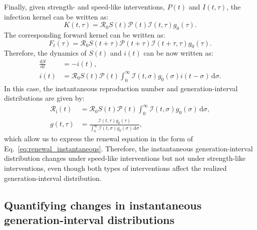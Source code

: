 \documentclass[12pt]{article}
\newcommand{\eref}[1]{Eq.~\ref{eq:#1}}
\newcommand{\Rx}[1]{\ensuremath{{\mathcal R}_{#1}}\xspace}
\newcommand{\Ro}{\Rx{0}}
\newcommand{\Ri}{\Rx{\mathrm{i}}}
\newcommand{\RR}{\ensuremath{{\mathcal R}}\xspace}
\newcommand{\dd}[1]{\ensuremath{\, \mathrm{d}#1}}
\newcommand{\dsigma}{\dd{\sigma}}
\newcommand{\PP}{{\mathcal P}}
\newcommand{\II}{{\mathcal I}}
\begin{document}
Finally, given strength- and speed-like interventions, $P(t)$ and $I(t, \tau)$, the infection kernel can be written as:
\begin{equation}
K(t, \tau) = \Ro S(t) \PP(t) \II(t,\tau) g_0(\tau).
\end{equation}
The corresponding forward kernel can be written as:
\begin{equation}
F_t(\tau) = \Ro S(t+\tau) \PP(t + \tau) \II(t+\tau, \tau) g_0(\tau).
\end{equation}
Therefore, the dynamics of $S(t)$ and $i(t)$ can be now written as:
\begin{align}
\frac{\mathrm{d}S}{\mathrm{d}t} &= - i(t),\\
i(t) &= \Ro S(t) \PP(t) \int_0^\infty \II(t, \sigma) g_0(\sigma) i(t-\sigma)\dsigma.
\end{align}
In this case, the instantaneous reproduction number and generation-interval distributions are given by:
\begin{align}
\Ri(t) &= \RR_0 S(t) \PP(t) \int_0^\infty \II(t,\sigma) g_0(\sigma) \dsigma,\\
g(t, \tau) &= \frac{\II(t,\tau) g_0(\tau)}{\int_0^\infty \II(t,\sigma) g_0(\sigma) \dsigma},
\end{align}
which allow us to express the renewal equation in the form of \eref{renewal_instantaneous}.
Therefore, the instantaneous generation-interval distribution changes under speed-like interventions but not under strength-like interventions, even though both types of interventions affect the realized generation-interval distribution.


\subsection{Quantifying changes in instantaneous generation-interval distributions}
\end{document}
